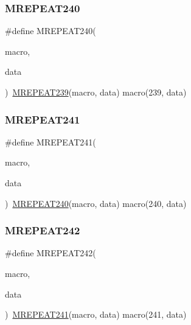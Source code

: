 \mbox{\label{group__group__sam0__utils__mrepeat_ga88afce60134e666d2674813cc05b06aa}} 
\subsubsection{\texorpdfstring{MREPEAT240}{MREPEAT240}}
{\footnotesize\ttfamily \#define M\+R\+E\+P\+E\+A\+T240(\begin{DoxyParamCaption}\item[{}]{macro,  }\item[{}]{data }\end{DoxyParamCaption})~\mbox{\hyperlink{group__group__sam0__utils__mrepeat_gac7ec468a3f485459ffcac683dd035e65}{M\+R\+E\+P\+E\+A\+T239}}(macro, data)   macro(239, data)}

\mbox{\label{group__group__sam0__utils__mrepeat_gac11f0502fa2d597c4b9a18351f87384a}} 
\subsubsection{\texorpdfstring{MREPEAT241}{MREPEAT241}}
{\footnotesize\ttfamily \#define M\+R\+E\+P\+E\+A\+T241(\begin{DoxyParamCaption}\item[{}]{macro,  }\item[{}]{data }\end{DoxyParamCaption})~\mbox{\hyperlink{group__group__sam0__utils__mrepeat_ga88afce60134e666d2674813cc05b06aa}{M\+R\+E\+P\+E\+A\+T240}}(macro, data)   macro(240, data)}

\mbox{\label{group__group__sam0__utils__mrepeat_gae6db0e42b34f92c59c76e0364573db92}} 
\subsubsection{\texorpdfstring{MREPEAT242}{MREPEAT242}}
{\footnotesize\ttfamily \#define M\+R\+E\+P\+E\+A\+T242(\begin{DoxyParamCaption}\item[{}]{macro,  }\item[{}]{data }\end{DoxyParamCaption})~\mbox{\hyperlink{group__group__sam0__utils__mrepeat_gac11f0502fa2d597c4b9a18351f87384a}{M\+R\+E\+P\+E\+A\+T241}}(macro, data)   macro(241, data)}

